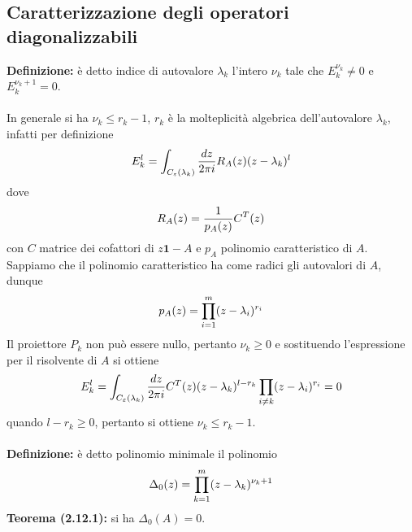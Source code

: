 \documentclass{article}
\begin{document}
\newpage
\subsection{Caratterizzazione degli operatori diagonalizzabili}
\textbf{Definizione:} è detto indice di autovalore $\lambda_k$ l'intero $\nu_k$ tale che $E_k^{\nu_k} \neq 0$ e $E_k^{\nu_k + 1} = 0$. \\ \\
In generale si ha $\nu_k \leq r_k - 1$, $r_k$ è la molteplicità algebrica dell'autovalore $\lambda_k$, infatti per definizione
\begin{gather}
    E_k^{l} = \int_{C_\varepsilon(\lambda_k)}\frac{dz}{2\pi i}R_A(z)(z - \lambda_k)^l \notag
\end{gather}
dove
\begin{gather}
    R_A(z) = \frac{1}{p_A(z)}C^T(z) \notag
\end{gather}
con $C$ matrice dei cofattori di $z\mathbf{1} - A$ e $p_A$ polinomio caratteristico di $A$. Sappiamo che il polinomio caratteristico ha come radici gli autovalori di $A$, dunque
\begin{gather}
    p_A(z) = \prod_{i = 1}^m(z - \lambda_i)^{r_i} \notag
\end{gather}
Il proiettore $P_k$ non può essere nullo, pertanto $\nu_k \geq 0$ e sostituendo l'espressione per il risolvente di $A$ si ottiene
\begin{gather}
    E_k^l = \int_{C_\varepsilon(\lambda_k)}\frac{dz}{2\pi i}C^T(z)(z - \lambda_k)^{l - r_k}\prod_{i \neq k}(z - \lambda_i)^{r_i} = 0 \notag
\end{gather}
quando $l - r_k \geq 0$, pertanto si ottiene $\nu_k \leq r_k - 1$. \\ \\
\textbf{Definizione:} è detto polinomio minimale il polinomio
\begin{gather}
    \Delta_0(z) = \prod_{k = 1}^m(z - \lambda_k)^{\nu_k + 1} \notag
\end{gather}
\textbf{Teorema (2.12.1):} si ha $\Delta_0(A) = 0$. \\
\end{document}
